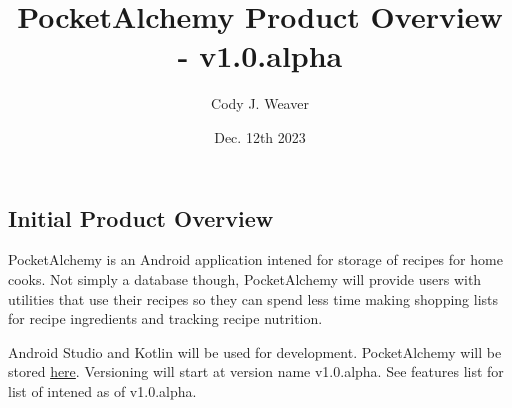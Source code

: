 \documentclass[12pt]{article}
\begin{document}
\title{PocketAlchemy Product Overview - v1.0.alpha}
\author{Cody J. Weaver}
\date{Dec. 12th 2023}
\maketitle

\begin{center}
\section*{Initial Product Overview}
\end{center}

\indent PocketAlchemy is an Android application intened for storage 
of recipes for home cooks. Not simply a database though, PocketAlchemy 
will provide users with utilities that use their recipes so they can spend
less time making shopping lists for recipe ingredients and tracking 
recipe nutrition.

\indent Android Studio and Kotlin will be used for development. PocketAlchemy
will be stored \href{https://github.com/CODYJEWELLWEAVER/PocketAlchemy}{here}.
Versioning will start at version name v1.0.alpha. See features list for list 
of intened as of v1.0.alpha.

    
\end{document}
